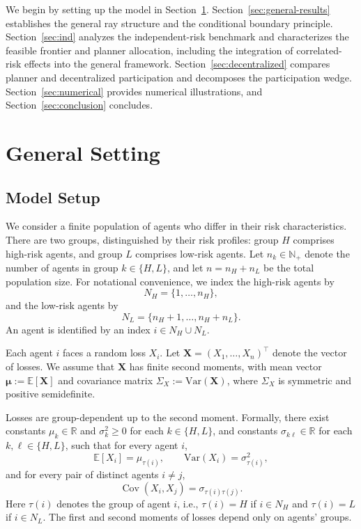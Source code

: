 \documentclass[a4paper,12pt]{article}
\theoremstyle{definition}
\theoremstyle{remark}
\DeclareMathOperator{\Cov}{Cov}
\newcommand{\E}{\mathbb{E}}
\newcommand{\Var}{\mathrm{Var}}
\newcommand{\1}{\mathbf{1}}
\begin{document}
We begin by setting up the model in Section~\ref{sec:model}. Section~\ref{sec:general-results} establishes the general ray structure and the conditional boundary principle. Section~\ref{sec:ind} analyzes the independent-risk benchmark and characterizes the feasible frontier and planner allocation, including the integration of correlated-risk effects into the general framework. Section~\ref{sec:decentralized} compares planner and decentralized participation and decomposes the participation wedge. Section~\ref{sec:numerical} provides numerical illustrations, and Section~\ref{sec:conclusion} concludes.


\section{General Setting}\label{sec:model}

\subsection{Model Setup}

We consider a finite population of agents who differ in their risk characteristics. There are two groups, distinguished by their risk profiles: group \(H\) comprises high-risk agents, and group \(L\) comprises low-risk agents. Let \(n_k\in\mathbb{N}_+\) denote the number of agents in group \(k\in\{H,L\}\), and let \(n=n_H+n_L\) be the total population size. For notational convenience, we index the high-risk agents by
\[
N_H = \{1,\dots,n_H\},
\]
and the low-risk agents by
\[
N_L = \{n_H+1,\dots,n_H+n_L\}.
\]
An agent is identified by an index \(i\in N_H \cup N_L\).

Each agent \(i\) faces a random loss \(X_i\). Let
$\mathbf X=(X_1,\dots,X_n)^\top$
denote the vector of losses. We assume that \(\mathbf X\) has finite second moments, with mean vector
$\boldsymbol{\mu}:=\E[\mathbf X]$
and covariance matrix
$\Sigma_X:=\Var(\mathbf X)$,
where \(\Sigma_X\) is symmetric and positive semidefinite.

Losses are group-dependent up to the second moment. Formally, there exist constants $\mu_k\in\mathbb{R}$ and $\sigma_k^2\ge 0$ for each $k\in\{H,L\}$, and constants $\sigma_{k\ell}\in\mathbb{R}$ for each $k,\ell\in\{H,L\}$, such that for every agent $i$,
\[
\E[X_i]=\mu_{\tau(i)},
\qquad
\Var(X_i)=\sigma_{\tau(i)}^2,
\]
and for every pair of distinct agents $i\neq j$,
\[
\Cov(X_i,X_j)=\sigma_{\tau(i)\tau(j)}.
\]
Here \(\tau(i)\) denotes the group of agent \(i\), i.e., \(\tau(i)=H\) if \(i\in N_H\) and \(\tau(i)=L\) if \(i\in N_L\). The first and second moments of losses depend only on agents' groups.
\end{document}
